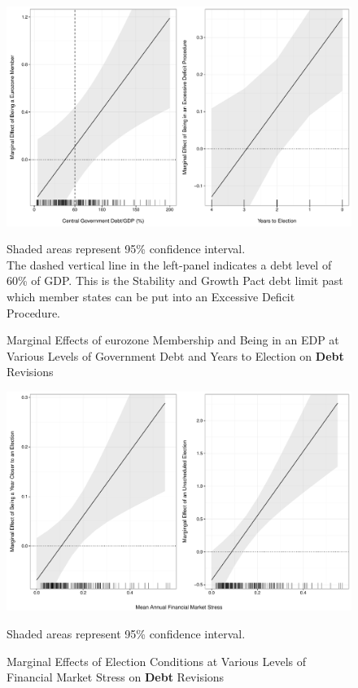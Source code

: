 \documentclass[]{article}
\begin{document}
\begin{figure}
    \caption{Marginal Effects of eurozone Membership and Being in an EDP at Various Levels of Government Debt and Years to Election on \textbf{Debt} Revisions}
    \label{me_debt_edp_elect}

    \begin{center}
        \includegraphics[scale=0.45]{figures/edp_debt_elect_me.pdf}
    \end{center}

	{\scriptsize{Shaded areas represent 95\% confidence interval.\\
    The dashed vertical line in the left-panel indicates a debt level of 60\% of GDP. This is the Stability and Growth Pact debt limit past which member states can be put into an Excessive Deficit Procedure.}}

\end{figure}

\begin{figure}
    \caption{Marginal Effects of Election Conditions at Various Levels of Financial Market Stress on \textbf{Debt} Revisions}
    \label{me_finstress_elect}

    \begin{center}
        \includegraphics[scale=0.45]{figures/fsi_elect_me.pdf}
    \end{center}

	{\scriptsize{Shaded areas represent 95\% confidence interval.}}

\end{figure}
\end{document}
